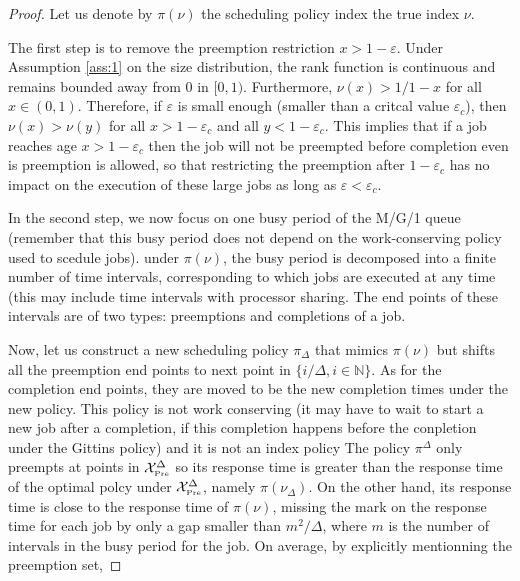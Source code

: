 \documentclass[11pt]{article}
\renewcommand{\epsilon}{\varepsilon}
\newcommand{\N}{\mathbb{N}}
\newcommand{\XP}{\mathcal{X}_{\mbox{\tiny Pre}}}
\begin{document}
\begin{proof}
  Let us denote by $\pi(\nu)$ the scheduling policy index the true index $\nu$.

  The first step is to remove the preemption restriction $x > 1-\epsilon$.
  Under Assumption \ref{ass:1} on the size distribution, the rank function  is continuous and remains bounded away from $0$ in $[0,1)$. Furthermore, $\nu(x) > 1/1-x$ for all $x\in (0,1)$. Therefore, if $\epsilon$ is small enough (smaller than a critcal value $\epsilon_c$), then $\nu(x) > \nu(y)$ for all $x> 1-\epsilon_c$ and all $y < 1-\epsilon_c$. This implies that if a job reaches age  $x > 1-\epsilon_c$ then the job will not be preempted before completion even is preemption is allowed, so that restricting the preemption after $1-
  \epsilon_c$ has no impact on the execution of these large jobs as long as $\epsilon < \epsilon_c$.
  
  
  
    In the second step, we now focus on one  busy period of the M/G/1 queue (remember that this busy period does not depend on the work-conserving policy used to scedule jobs).
    under  $\pi(\nu)$, the busy period is decomposed into a finite number of time intervals, corresponding to which jobs are executed at any time (this may include time intervals with processor sharing.
    The end points of these intervals are of two types: preemptions and completions of a job.
    
  Now, let us construct a new scheduling policy $\pi_\Delta$ that mimics $\pi(\nu)$ but  shifts  all the preemption end points to next point in $ \{ i/\Delta, i\in \N\}$. As for the completion end points, they are moved to be the new completion times under the new policy. This policy is not work conserving (it may have to wait to start a new job after a completion, if this completion happens  before the conpletion under the Gittins policy) and it is not an index policy
  The policy $\pi^\Delta$ only preempts at points in  $\XP^\Delta$ so its response time is greater than the response time of the optimal polcy under   $\XP^\Delta$, namely $\pi(\nu_\Delta)$. On the other hand, its response time is close to the response time of $\pi(\nu)$, missing the mark on the response time for each job by only a gap smaller than $m^2 /\Delta$, where $m$ is the number of  intervals in the busy period for the job. On average, by explicitly mentionning the preemption set, 
  

\end{proof}
\end{document}
